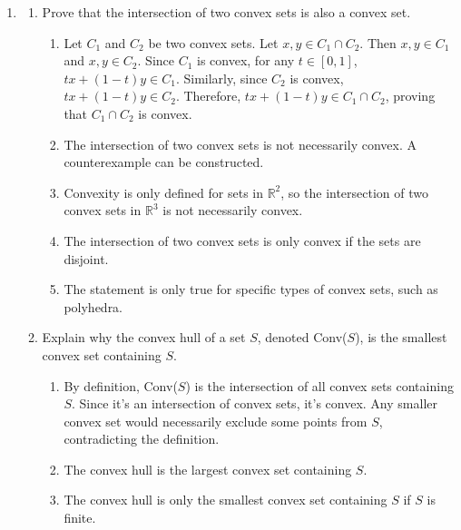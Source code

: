 \documentclass{article}%
\begin{document}
\begin{enumerate}
\begin{enumerate}
\item Conv($S$) is the line segment connecting (1, 0) and (0, 1). The point (1/2, 1/2) is a convex combination of (1,0) and (0,1).%
\item Conv($S$) is the set $S$ itself.  There is no convex combination of all three points.%
\item Conv($S$) is the entire $\mathbb{R}^2$ plane.%
\item Conv($S$) is undefined for this set $S$.%
\end{enumerate}%
\vspace{1em}%
\item%
\begin{enumerate}%
\item Prove that the intersection of two convex sets is also a convex set.%
\begin{enumerate}%
\item Let $C_1$ and $C_2$ be two convex sets. Let $x, y \in C_1 \cap C_2$. Then $x, y \in C_1$ and $x, y \in C_2$. Since $C_1$ is convex, for any $t \in [0, 1]$, $tx + (1-t)y \in C_1$. Similarly, since $C_2$ is convex, $tx + (1-t)y \in C_2$. Therefore, $tx + (1-t)y \in C_1 \cap C_2$, proving that $C_1 \cap C_2$ is convex.%
\item The intersection of two convex sets is not necessarily convex.  A counterexample can be constructed.%
\item Convexity is only defined for sets in $\mathbb{R}^2$, so the intersection of two convex sets in $\mathbb{R}^3$ is not necessarily convex.%
\item The intersection of two convex sets is only convex if the sets are disjoint.%
\item The statement is only true for specific types of convex sets, such as polyhedra.%
\end{enumerate}%
\vspace{0.5em}%
\item Explain why the convex hull of a set $S$, denoted Conv($S$), is the smallest convex set containing $S$.%
\begin{enumerate}%
\item By definition, Conv($S$) is the intersection of all convex sets containing $S$.  Since it's an intersection of convex sets, it's convex. Any smaller convex set would necessarily exclude some points from $S$, contradicting the definition.%
\item The convex hull is the largest convex set containing $S$.%
\item The convex hull is only the smallest convex set containing $S$ if $S$ is finite.%

\end{enumerate}
\end{enumerate}
\end{enumerate}
\end{document}
